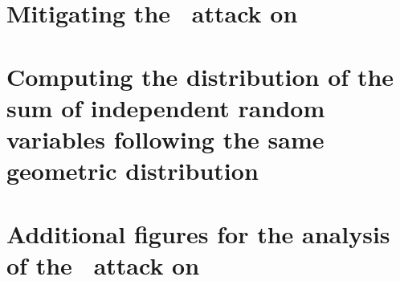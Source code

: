 \documentclass[11pt, twoside]{report}
\begin{document}
  \chapter{Mitigating the \cs\ attack on \FC}
    
  \printbibliography
  \appendix
  \chapter{Computing the distribution of the sum of independent random variables following the same geometric distribution}
    
  \chapter{Additional figures for the analysis of the \cs\ attack on \FC}
    
\end{document}
